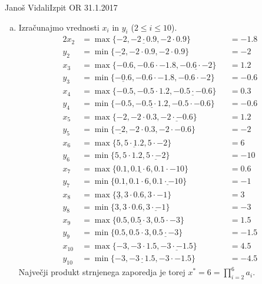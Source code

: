 \begin{naloga}{Janoš Vidali}{Izpit OR 31.1.2017}
\begin{odgovor}
\begin{enumerate}[(a)]
\item Izračunajmo vrednosti $x_i$ in $y_i$ ($2 \le i \le 10$).
\begin{alignat*}{2}
x_2 &= \max\{-2, \underline{-2 \cdot 0.9}, -2 \cdot 0.9\} &&= -1.8 \\
y_2 &= \min\{\underline{-2}, -2 \cdot 0.9, -2 \cdot 0.9\} &&= -2 \\
x_3 &= \max\{-0.6, -0.6 \cdot -1.8, \underline{-0.6 \cdot -2}\} &&= 1.2 \\
y_3 &= \min\{\underline{-0.6}, -0.6 \cdot -1.8, -0.6 \cdot -2\} &&= -0.6 \\
x_4 &= \max\{-0.5, -0.5 \cdot 1.2, \underline{-0.5 \cdot -0.6}\} &&= 0.3 \\
y_4 &= \min\{-0.5, \underline{-0.5 \cdot 1.2}, -0.5 \cdot -0.6\} &&= -0.6 \\
x_5 &= \max\{-2, -2 \cdot 0.3, \underline{-2 \cdot -0.6}\} &&= 1.2 \\
y_5 &= \min\{\underline{-2}, -2 \cdot 0.3, -2 \cdot -0.6\} &&= -2 \\
x_6 &= \max\{5, \underline{5 \cdot 1.2}, 5 \cdot -2\} &&= 6 \\
y_6 &= \min\{5, 5 \cdot 1.2, \underline{5 \cdot -2}\} &&= -10 \\
x_7 &= \max\{0.1, \underline{0.1 \cdot 6}, 0.1 \cdot -10\} &&= 0.6 \\
y_7 &= \min\{0.1, 0.1 \cdot 6, \underline{0.1 \cdot -10}\} &&= -1 \\
x_8 &= \max\{\underline{3}, 3 \cdot 0.6, 3 \cdot -1\} &&= 3 \\
y_8 &= \min\{3, 3 \cdot 0.6, \underline{3 \cdot -1}\} &&= -3 \\
x_9 &= \max\{0.5, \underline{0.5 \cdot 3}, 0.5 \cdot -3\} &&= 1.5 \\
y_9 &= \min\{0.5, 0.5 \cdot 3, \underline{0.5 \cdot -3}\} &&= -1.5 \\
x_{10} &= \max\{-3, -3 \cdot 1.5, \underline{-3 \cdot -1.5}\} &&= 4.5 \\
y_{10} &= \min\{-3, \underline{-3 \cdot 1.5}, -3 \cdot -1.5\} &&= -4.5
\end{alignat*}
Največji produkt strnjenega zaporedja je torej
$x^* = 6 = \prod_{i=2}^6 a_i$.
\end{enumerate}
\end{odgovor}
\end{naloga}

